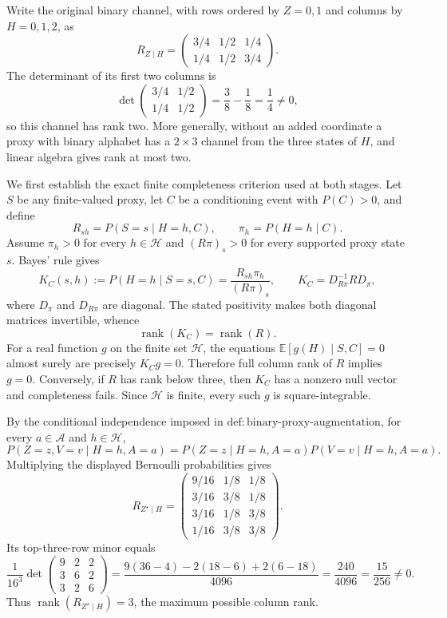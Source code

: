 Write the original binary channel, with rows ordered by \(Z=0,1\) and columns by \(H=0,1,2\), as
\[
 R_{Z\mid H}=
 \begin{pmatrix}
  3/4&1/2&1/4\\
  1/4&1/2&3/4
 \end{pmatrix}.
\]
The determinant of its first two columns is
\[
 \det\!\begin{pmatrix}3/4&1/2\\1/4&1/2\end{pmatrix}
 =\frac{3}{8}-\frac{1}{8}=\frac14\ne0,
\]
so this channel has rank two. More generally, without an added coordinate a proxy with binary alphabet has a \(2\times3\) channel from the three states of \(H\), and linear algebra gives rank at most two.

We first establish the exact finite completeness criterion used at both stages. Let \(S\) be any finite-valued proxy, let \(C\) be a conditioning event with \(P(C)>0\), and define
\[
 R_{sh}=P(S=s\mid H=h,C),\qquad
 \pi_h=P(H=h\mid C).
\]
Assume \(\pi_h>0\) for every \(h\in\mathcal H\) and \((R\pi)_s>0\) for every supported proxy state \(s\). Bayes' rule gives
\[
 K_C(s,h):=P(H=h\mid S=s,C)
 =\frac{R_{sh}\pi_h}{(R\pi)_s},
 \qquad
 K_C=D_{R\pi}^{-1}R D_\pi,
\]
where \(D_\pi\) and \(D_{R\pi}\) are diagonal. The stated positivity makes both diagonal matrices invertible, whence
\[
 \operatorname{rank}(K_C)=\operatorname{rank}(R).
\]
For a real function \(g\) on the finite set \(\mathcal H\), the equations \(\mathbb E[g(H)\mid S,C]=0\) almost surely are precisely \(K_Cg=0\). Therefore full column rank of \(R\) implies \(g=0\). Conversely, if \(R\) has rank below three, then \(K_C\) has a nonzero null vector and completeness fails. Since \(\mathcal H\) is finite, every such \(g\) is square-integrable.

By the conditional independence imposed in \(\mathrm{def{:}binary\text{-}proxy\text{-}augmentation}\), for every \(a\in\mathcal A\) and \(h\in\mathcal H\),
\[
 P(Z=z,V=v\mid H=h,A=a)
 =P(Z=z\mid H=h,A=a)P(V=v\mid H=h,A=a).
\]
Multiplying the displayed Bernoulli probabilities gives
\[
 R_{Z^{\star}\mid H}=
 \begin{pmatrix}
  9/16&1/8&1/8\\
  3/16&3/8&1/8\\
  3/16&1/8&3/8\\
  1/16&3/8&3/8
 \end{pmatrix}.
\]
Its top-three-row minor equals
\[
 \frac{1}{16^3}
 \det\!\begin{pmatrix}9&2&2\\3&6&2\\3&2&6\end{pmatrix}
 =\frac{9(36-4)-2(18-6)+2(6-18)}{4096}
 =\frac{240}{4096}=\frac{15}{256}\ne0.
\]
Thus \(\operatorname{rank}(R_{Z^{\star}\mid H})=3\), the maximum possible column rank.

